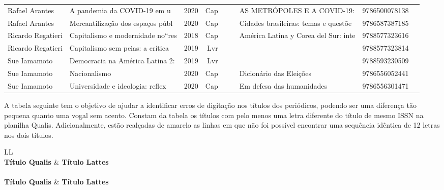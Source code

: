 \documentclass[12pt,brazil]{article}\usepackage[]{graphicx}\usepackage[]{xcolor}
\newcounter{tabela}
\begin{document}
\begin{longtable}{lllrrllrr}
Rafael Arantes & A pandemia da COVID-19 em u & 2020 & Cap &  &  & AS METRÓPOLES E A COVID-19: & 9786500078138 \\
Rafael Arantes & Mercantilização dos espaços públ & 2020 & Cap &  &  & Cidades brasileiras: temas e questõe & 9786587387185 \\
Ricardo Regatieri & Capitalismo e modernidade no“res & 2018 & Cap &  &  & América Latina y Corea del Sur: inte & 9788577323616 \\
Ricardo Regatieri & Capitalismo sem peias: a crítica & 2019 & Lvr &  &  &  & 9788577323814 \\
Sue Iamamoto & Democracia na América Latina 2:  & 2019 & Lvr &  &  &  & 9788593230509 \\
Sue Iamamoto & Nacionalismo & 2020 & Cap &  &  & Dicionário das Eleições & 9786556052441 \\
\rowcolor{coautr}Sue Iamamoto & Universidade e ideologia: reflex & 2020 & Cap &  &  & Em defesa das humanidades & 9786556301471 \\
\end{longtable}

\normalsize

\clearpage

A tabela seguinte tem o objetivo de ajudar a identificar erros de
digitação nos títulos dos periódicos, podendo ser uma diferença tão pequena
quanto uma vogal sem acento. Constam da tabela os títulos com pelo menos uma
letra diferente do título de mesmo ISSN na planilha Qualis. Adicionalmente,
estão realçadas de amarelo as linhas em que não foi possível encontrar uma
sequência idêntica de 12 letras nos dois títulos.

\label{ tab:ttldif }
\begin{ltabulary}{LL}
 \\
  \toprule
\textbf{Título Qualis} & \textbf{Título Lattes} \\
\midrule
\endfirsthead
{} \\
  \toprule
\textbf{Título Qualis} & \textbf{Título Lattes} \\
\midrule
\endhead
\midrule
{} \\
\endfoot
\bottomrule
\endlastfoot
 \\
\end{ltabulary}
\end{document}
